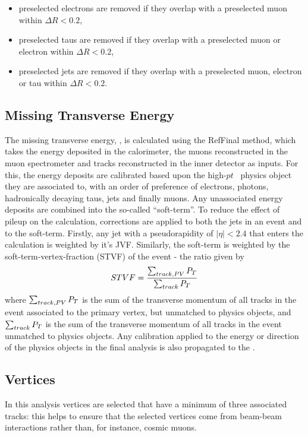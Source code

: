\begin{itemize}
\item preselected electrons are removed if they overlap with a preselected muon  within $\Delta R < 0.2$,
\item preselected taus are removed if they overlap with a preselected muon or electron within $\Delta R < 0.2$,
\item preselected jets are removed  if they overlap with a preselected
  muon, electron or tau within \linebreak $\Delta R<0.2$.
\end{itemize}

\subsection{Missing Transverse Energy}
\label{sec:presel:met}

The missing transverse energy, \met, is calculated using the
RefFinal method, which takes the energy
deposited in the calorimeter, the muons reconstructed in the muon
spectrometer and tracks reconstructed in the inner detector as inputs. 
For this, the energy deposits are calibrated based
upon the high-$pt$~ physics object they are associated to, with an order
of preference of electrons, photons, hadronically decaying taus, jets
and finally muons. Any unassociated energy deposits are combined into
the so-called ``soft-term''. To reduce the effect of pileup on the
\met calculation, corrections are applied to both the jets in an event
and to the soft-term. Firstly, any jet with a pseudorapidity of $|\eta|<2.4$
that enters the \met calculation is weighted by it's JVF. Similarly,
the soft-term is weighted by the soft-term-vertex-fraction (STVF) of
the event - the ratio given by
\begin{equation}
STVF = \frac{\sum_{track, PV}P_{T}}{\sum_{track}P_{T}}
\end{equation}
where $\sum_{track, PV}P_{T}$ is the sum of the transverse momentum of
all tracks in the event associated to the primary vertex, but unmatched to physics
objects, and $\sum_{track}P_{T}$ is the sum of
the transverse momentum of all tracks in the event unmatched to
physics objects. Any calibration applied
to the energy or direction of the physics objects in the final
analysis is also propagated to the \met.


\subsection{Vertices} 
\label{sec:presel:vertices}
In this analysis vertices are selected that have a minimum of three
associated tracks: this helps to ensure that the selected vertices
come from beam-beam interactions rather than, for instance, cosmic
muons.

